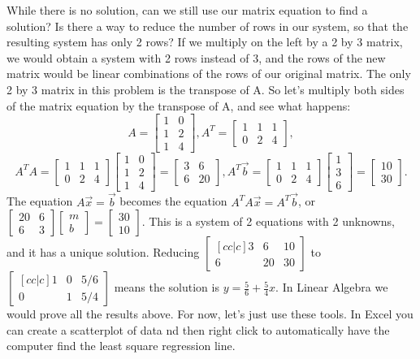 While there is no solution, can we still use our matrix equation to find a solution? Is there a way to reduce the number of rows in our system, so that the resulting system has only 2 rows? If we multiply on the left by a 2 by 3 matrix, we would obtain a system with 2 rows instead of 3, and the rows of the new matrix would be linear combinations of the rows of our original matrix.  The only 2 by 3 matrix in this problem is the transpose of A.  So let's multiply both sides of the matrix equation by the transpose of A, and see what happens:
$$A = \begin{bmatrix}1&0\\1&2\\1&4\end{bmatrix}, 
A^T = \begin{bmatrix}1&1&1\\0&2&4\end{bmatrix},$$$$ 
A^T A =\begin{bmatrix}1&1&1\\0&2&4\end{bmatrix}\begin{bmatrix}1&0\\1&2\\1&4\end{bmatrix}= \begin{bmatrix}3&6\\6&20\end{bmatrix}, 
A^T\vec b =  \begin{bmatrix}1&1&1\\0&2&4\end{bmatrix}\begin{bmatrix}1\\3\\6\end{bmatrix} = \begin{bmatrix}10\\30\end{bmatrix}.
$$
The equation $A\vec x = \vec b$ becomes the equation $A^T A \vec x = A^T\vec b$, or $\begin{bmatrix}20&6\\6&3\end{bmatrix} \begin{bmatrix}m\\b\end{bmatrix}=\begin{bmatrix}30\\10\end{bmatrix}$. This is a system of 2 equations with 2 unknowns, and it has a unique solution.  Reducing $\begin{bmatrix}[cc|c]3&6&10\\6&20&30\end{bmatrix}$ to $\begin{bmatrix}[cc|c]1&0&5/6\\0&1&5/4\end{bmatrix}$ means the solution is $y=\frac{5}{6}+\frac{5}{4}x.$  In Linear Algebra we would prove all the results above. For now, let's just use these tools.  In Excel you can create a scatterplot of data nd then right click to automatically have the computer find the least square regression line.  

